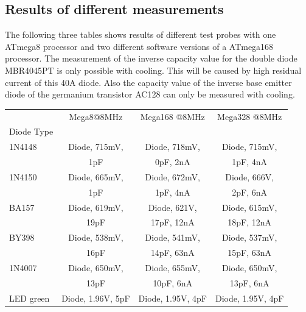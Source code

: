 \subsection{Results of different measurements}
The following three tables shows results of different test probes 
with one ATmega8 processor and two different software versions of a ATmega168 processor.
The measurement of the inverse capacity value for the double diode MBR4045PT is 
only possible with cooling. This will be caused by high residual current of this 40A diode.
Also the capacity value of the inverse base emitter diode of the germanium transistor AC128 can
only be measured with cooling.

\begin{table}[H]
  \begin{center}
    \begin{tabular}{| l | c | c | c |}
    \hline
           & Mega8@8MHz & Mega168 @8MHz & Mega328 @8MHz \\
 Diode Type  &                  &                  &                  \\
    \hline
    \hline
1N4148     & Diode, 715mV,        & Diode, 718mV,            & Diode, 715mV,           \\
           &               1pF    &               0pF, 2nA   &               1pF, 4nA  \\
    \hline
1N4150     & Diode, 665mV,        & Diode, 672mV,            & Diode, 666V,           \\
           &               1pF    &               1pF, 4nA   &              2pF, 6nA  \\
    \hline
BA157      & Diode, 619mV,        & Diode, 621V,              & Diode, 615mV,            \\
           &               19pF   &              17pF, 12nA   &               18pF, 12nA \\
    \hline
BY398      & Diode, 538mV,        & Diode, 541mV,             & Diode, 537mV,            \\
           &               16pF   &               14pF, 63nA  &               15pF, 63nA \\
    \hline
1N4007     & Diode, 650mV,        & Diode, 655mV,            & Diode, 650mV,           \\
           &               13pF   &               10pF, 6nA  &               13pF, 6nA \\
    \hline
LED green  & Diode, 1.96V, 5pF    & Diode, 1.95V, 4pF   & Diode, 1.95V, 4pF \\

\end{tabular}
\end{center}
\end{table}
